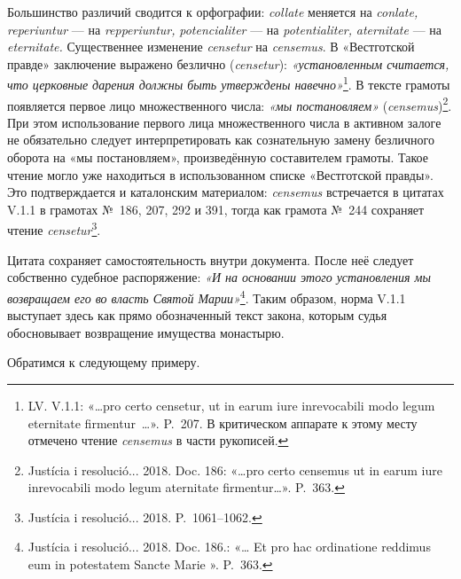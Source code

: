 Большинство различий сводится к орфографии: \emph{collate}\emph{ }меняется на\emph{ }\emph{conlate}\emph{, }\emph{reperiuntur}\emph{ }--- на \emph{repperiuntur}\emph{, }\emph{potencialiter}\emph{ }--- на \emph{potentialiter}\emph{, }\emph{aternitate}\emph{ }--- на\emph{ }\emph{eternitate}\emph{.} Существеннее изменение \emph{censetur} на \emph{censemus}. В «Вестготской правде» заключение выражено безлично (\emph{censetur}): \emph{«}\emph{установленным считается, что церковные дарения должны быть утверждены навечно}\emph{»}\footnote{LV. V.1.1: «…pro certo censetur, ut in earum iure inrevocabili modo legum eternitate firmentur~…». P.~207. В критическом аппарате к этому месту отмечено чтение \emph{censemus} в части рукописей.}. В тексте грамоты появляется первое лицо множественного числа: \emph{«мы постановляем»} (\emph{cense}\emph{mus})\footnote{Justícia i resolució... 2018. Doc. 186: «…pro certo censemus ut in earum iure inrevocabili modo legum aternitate firmentur…». P.~363.}. При этом использование первого лица множественного числа в активном залоге не обязательно следует интерпретировать как сознательную замену безличного оборота на «мы постановляем», произведённую составителем грамоты. Такое чтение могло уже находиться в использованном списке «Вестготской правды». Это подтверждается и каталонским материалом: \emph{censemus} встречается в цитатах V.1.1 в грамотах №~186, 207, 292 и 391, тогда как грамота №~244 сохраняет чтение \emph{censetur}\footnote{Justícia i resolució... 2018. P.~1061--1062.}.

Цитата сохраняет самостоятельность внутри документа. После неё следует собственно судебное распоряжение: \emph{«И на основании этого установления мы возвращаем его во власть Святой Марии»}\footnote{Justícia i resolució... 2018. Doc. 186.: «… Et pro hac ordinatione reddimus eum in potestatem Sancte Marie ». P.~363.}. Таким образом, норма V.1.1 выступает здесь как прямо обозначенный текст закона, которым судья обосновывает возвращение имущества монастырю.

Обратимся к следующему примеру.

